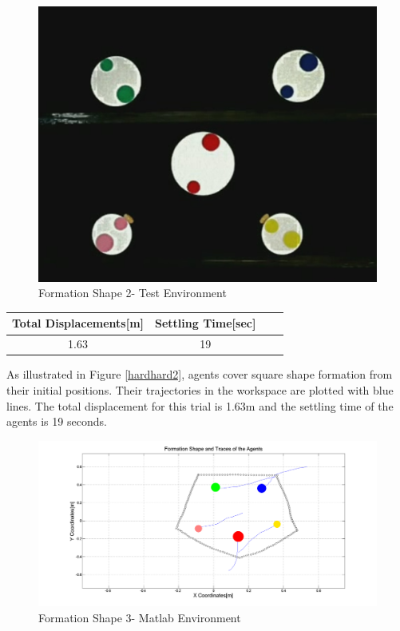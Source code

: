 \begin{figure}[H]
\caption{Formation Shape 2- Test Environment}
\centerline{\includegraphics[scale = 0.35]{4_real_hardware}}
\end{figure} 
					
\begin{center}
 \label{hardwareshape2_ref} 
\begin{tabular}{||c| c |c |c ||}
\hline
Total Displacements[m]  & Settling Time[sec]\\ 
\hline
1.63 & 19 \\
\hline
\end{tabular}
\end{center}

As illustrated in Figure \ref{hardhard2}, agents cover square shape formation from their initial positions. Their trajectories in the workspace are plotted with blue lines. The total displacement for this trial is 1.63m and the settling time of the agents is 19 seconds.	
				
\begin{figure}[H]
\caption{Formation Shape 3- Matlab Environment} \label{hardhard3}
\centerline{\includegraphics[scale = 0.32]{5_hardware}}
\end{figure} 
					
